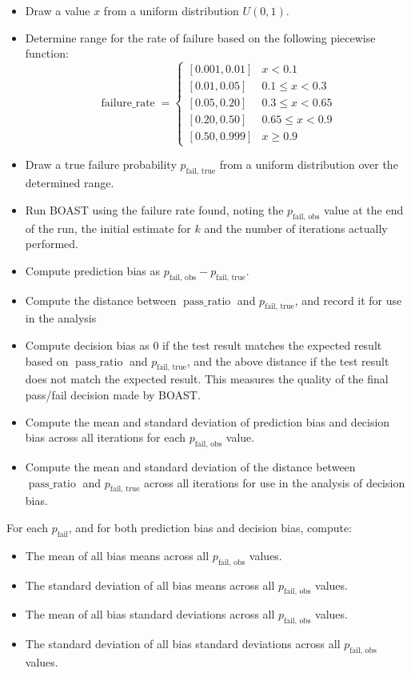    \begin{itemize}
        \item Draw a value $x$ from a uniform distribution $U(0, 1)$.
        \item Determine range for the rate of failure based on the following piecewise function:
        \[
            \operatorname{failure\_rate} =
            \begin{cases}
                [0.001, 0.01] & x < 0.1 \\
                [0.01, 0.05] & 0.1 \le x < 0.3 \\
                [0.05, 0.20] & 0.3 \le x < 0.65 \\
                [0.20, 0.50] & 0.65 \le x < 0.9 \\
                [0.50, 0.999] & x \ge 0.9
            \end{cases}
        \]
        \item Draw a true failure probability $p_\text{fail, true}$ from a uniform distribution over the determined range.
        \item Run BOAST using the failure rate found, noting the $p_\text{fail, obs}$ value at the end of the run, the initial estimate for $k$ and the number of iterations actually performed.
        \item Compute prediction bias as $p_\text{fail, obs} - p_\text{fail, true}$.
        \item Compute the distance between $\operatorname{pass\_ratio}$ and $p_\text{fail, true}$, and record it for use in the analysis
        \item Compute decision bias as $0$ if the test result matches the expected result based on $\operatorname{pass\_ratio}$ and $p_\text{fail, true}$, and the above distance if the test result does not match the expected result. This measures the quality of the final pass/fail decision made by BOAST.
        \item Compute the mean and standard deviation of prediction bias and decision bias across all iterations for each $p_\text{fail, obs}$ value.
        \item Compute the mean and standard deviation of the distance between $\operatorname{pass\_ratio}$ and $p_\text{fail, true}$ across all iterations for use in the analysis of decision bias.
    \end{itemize}
            
    For each $p_\text{fail}$, and for both prediction bias and decision bias, compute:
    \begin{itemize}
        \item The mean of all bias means across all $p_\text{fail, obs}$ values.
        \item The standard deviation of all bias means across all $p_\text{fail, obs}$ values.
        \item The mean of all bias standard deviations across all $p_\text{fail, obs}$ values.
        \item The standard deviation of all bias standard deviations across all $p_\text{fail, obs}$ values.
    \end{itemize}


